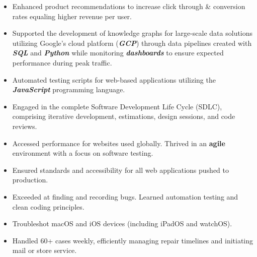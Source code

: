 \documentclass[10pt,a4paper,ragged2e,withhyper]{altacv}
\begin{document}
\begin{paracol}{2}

\begin{itemize}
\item Enhanced product recommendations to increase click through \& conversion rates equaling higher revenue per user. 
\item Supported the development of knowledge graphs for large-scale data solutions utilizing Google’s cloud platform (\textbf{\textit{GCP}}) through data pipelines created with \textbf{\textit{SQL}} and \textbf{\textit{Python}} while monitoring \textbf{\textit{dashboards}} to ensure expected performance during peak traffic.
\item Automated testing scripts for web-based applications utilizing the \textbf{\textit{JavaScript}} programming language. 
\item Engaged in the complete Software Development Life Cycle (SDLC), comprising iterative development, estimations, design sessions, and code reviews.
\end{itemize}

\divider

\begin{itemize}
\item Accessed performance for websites used globally. Thrived in an \textbf{agile} environment with a focus on software testing. 
\item Ensured standards and accessibility for all web applications pushed to production.
\item Exceeded at finding and recording bugs. Learned automation testing and clean coding principles.
\end{itemize}

\divider

\begin{itemize}
\item Troubleshot macOS and iOS devices (including iPadOS and watchOS). 
\item Handled 60+ cases weekly, efficiently managing repair timelines and initiating mail or store service.
\end{itemize}


\end{paracol}
\end{document}
